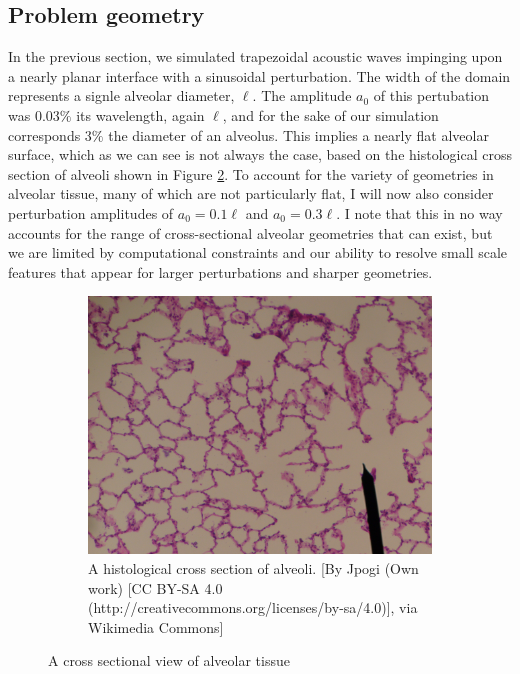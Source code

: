 \subsection{Problem geometry}
In the previous section, we simulated trapezoidal acoustic waves
impinging upon a nearly planar interface with a sinusoidal
perturbation. The width of the domain represents a signle alveolar
diameter, $\ell$. The amplitude $a_0$ of this pertubation was $0.03\%$
its wavelength, again $\ell$, and for the sake of our simulation
corresponds $3\%$ the diameter of an alveolus. This implies a nearly
flat alveolar surface, which as we can see is not always the case,
based on the histological cross section of alveoli shown in Figure
\ref{fig:alveolar_histology}. To account for the variety of geometries
in alveolar tissue, many of which are not particularly flat, I will
now also consider perturbation amplitudes of $a_0=0.1\ell$ and
$a_0=0.3\ell$. I note that this in no way accounts for the range of
cross-sectional alveolar geometries that can exist, but we are limited
by computational constraints and our ability to resolve small scale
features that appear for larger perturbations and sharper geometries.
\begin{figure}
  \centering
  \begin{subfigure}[b]{0.45\textwidth}
    \includegraphics[width=\textwidth]{./figs/lung_figs/alveolar_sac}
    \caption{\label{fig:alveolar_histology}A histological cross section of alveoli. [By Jpogi (Own work) [CC BY-SA 4.0
      (http://creativecommons.org/licenses/by-sa/4.0)], via Wikimedia
      Commons]}
  \end{subfigure}
  \caption{A cross sectional view of alveolar tissue \protect{}}
\end{figure}
% 
